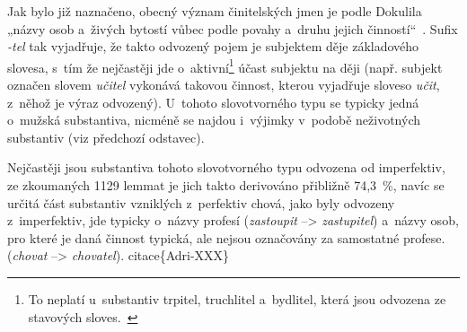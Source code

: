 Jak bylo již naznačeno, obecný význam činitelských jmen je podle
Dokulila „názvy osob a~živých bytostí vůbec podle povahy a~druhu jejich
činností``~\parencite[17]{dokulil67}. Sufix \emph{-tel} tak vyjadřuje,
že takto odvozený pojem je subjektem děje základového slovesa, s~tím že
nejčastěji jde
o~aktivní\footnote{To neplatí u~substantiv trpitel, truchlitel a~bydlitel, která jsou odvozena ze stavových sloves.~\parencite[17]{dokulil67}}
účast subjektu na ději (např. subjekt označen slovem \emph{učitel}
vykonává takovou činnost, kterou vyjadřuje sloveso \emph{učit}, z~něhož
je výraz odvozený). U~tohoto slovotvorného typu se typicky jedná
o~mužská substantiva, nicméně se najdou i~výjimky v~podobě neživotných
substantiv (viz předchozí odstavec).~\parencite{simandl2016}

Nejčastěji jsou substantiva tohoto slovotvorného typu odvozena od
imperfektiv, ze zkoumaných 1129 lemmat je jich takto derivováno
přibližně 74,3~\%, navíc se určitá část substantiv vzniklých z~perfektiv
chová, jako byly odvozeny z~imperfektiv, jde typicky o~názvy profesí
(\emph{zastoupit} --\textgreater{} \emph{zastupitel}) a~názvy osob, pro
které je daná činnost typická, ale nejsou označovány za samostatné
profese. (\emph{chovat} --\textgreater{} \emph{chovatel}).
citace\{Adri-XXX\}
